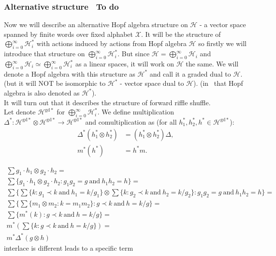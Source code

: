 \documentclass[a4paper]{article}
\newcommand{\gdd}[1]{#1^{\mathrm{gd}*}}
\newcommand{\smalltodo}[1]{\textbf{\ To do}}
\begin{document}
\subsubsection{Alternative structure \smalltodo{a}}
\indent Now we will describe an alternative Hopf algebra structure on $\mathcal{H}$ - a vector space spanned
by finite words over fixed alphabet $\mathcal{X}$. It will be the
structure of $\displaystyle\bigoplus^{\infty}_{i = 0} \mathcal{H}_i^*$ with actions induced by actions from
Hopf algebra $\mathcal{H}$ so firstly we will introduce that structure on
$\displaystyle\bigoplus^{\infty}_{i = 0} \mathcal{H}_i^*$. But since $\mathcal{H} =
\displaystyle\bigoplus^{\infty}_{i = 0} \mathcal{H}_i$ and $\displaystyle\bigoplus^{\infty}_{i = 0}
\mathcal{H}_i \simeq \displaystyle\bigoplus^{\infty}_{i = 0} \mathcal{H}_i^*$ as a linear spaces, it will
work on $\mathcal{H}$ the same. We will denote a Hopf algebra with this structure
as $\mathcal{H}^*$ and call it a graded dual to $\mathcal{H}$. (but it will NOT be isomorphic to
$\mathcal{H}^*$ - vector space dual to $\mathcal{H}$). (in~\cite{Diaconis2014} that Hopf algebra is also
denoted as $\mathcal{H}^*$).  \\
It will turn out that it describes the structure of forward riffle shuffle. \\
\indent Let denote $\gdd{\mathcal{H}}$ for $\displaystyle\bigoplus^{\infty}_{i = 0} \mathcal{H}_i^*$.
We define multiplication
$\Delta^* : \mathcal{H}^{\mathrm{gd}*} \otimes \gdd{\mathcal{H}} \to \gdd{\mathcal{H}}$ and
comultiplication
\text{$m^* : \gdd{\mathcal{H}} \to \gdd{\mathcal{H}} \otimes \gdd{\mathcal{H}}$} as
(for all $h_1^*, h_2^*, h^* \in \gdd{\mathcal{H}}$):
\begin{align*}
\Delta^*(h_1^* \otimes h_2^*) &= (h_1^* \otimes h_2^*)\Delta, \\
m^*(h^*) &= h^*m.
\end{align*}

\begin{gather*}
\sum g_1 \cdot h_1 \otimes g_2 \cdot h_2 = \\
\sum \{g_1 \cdot h_1 \otimes g_2 \cdot h_2 : g_1g_2=g \mathrm{\ and\ } h_1h_2 = h\} =\\
\sum \{ \sum\{k : g_1 \prec k \mathrm{\ and\ } h_1 = k/g_1\} \otimes
\sum\{k : g_2 \prec k \mathrm{\ and\ } h_2 = k/g_2\} : g_1g_2=g \mathrm{\ and\ } h_1h_2 = h\} = \\
\sum\{ \sum\{ m_1 \otimes m_2 : k=m_1m_2 \} : g \prec k \mathrm{\ and\ } h = k/g\} = \\
\sum\{m^*(k) : g \prec k \mathrm{\ and\ } h = k/g\} = \\
m^*\left(\sum\{k : g \prec k \mathrm{\ and\ } h = k/g\}\right) = \\
m^*\Delta^*(g \otimes h)
\end{gather*}
interlace is different
leads to a specific term
\end{document}
